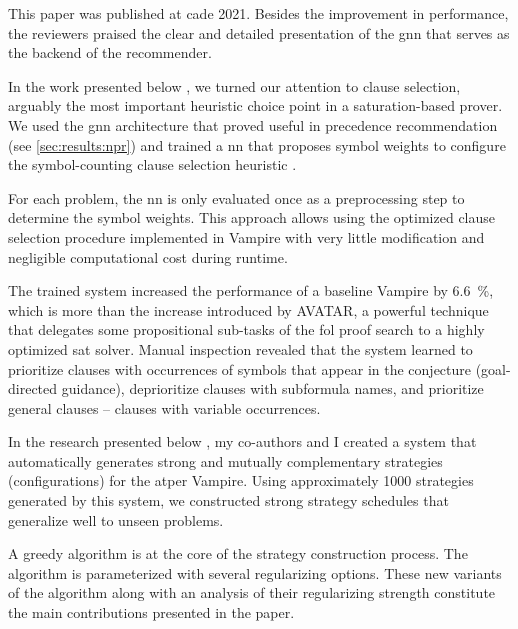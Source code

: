 This paper was published at \gls{cade} 2021.
Besides the improvement in performance,
the reviewers praised the clear and detailed presentation of the \gls{gnn} that serves as the backend of the recommender.


\label{sec:results:selection}

In the work presented below \cite{DBLP:conf/lpar/Bartek023},
we turned our attention to clause selection,
arguably the most important heuristic choice point in a saturation-based prover.
We used the \gls{gnn} architecture
that proved useful in precedence recommendation (see \cref{sec:results:npr})
and trained a \gls{nn} that proposes symbol weights to configure the symbol-counting clause selection heuristic \cite{DBLP:conf/cade/SchulzM16,E-manual}.

For each problem, the \gls{nn} is only evaluated once as a preprocessing step to determine the symbol weights.
This approach allows using the optimized clause selection procedure implemented in Vampire
with very little modification and negligible computational cost during runtime.

The trained system increased the performance of a baseline Vampire by \SI{6.6}{\percent},
which is more than the increase introduced by AVATAR,
a powerful technique that delegates some propositional sub-tasks of the \gls{fol} proof search to a highly optimized \gls{sat} solver.
Manual inspection revealed that
the system learned to
prioritize clauses with occurrences of symbols that appear in the conjecture (goal-directed guidance),
deprioritize clauses with subformula names,
and prioritize general clauses -- clauses with variable occurrences.


\label{sec:results:regularization}

In the research presented below \cite{DBLP:conf/ijcar/BartekCS24},
my co-authors and I created a system that automatically generates strong and mutually complementary strategies (configurations) for the \gls{atper} Vampire.
Using approximately 1000 strategies generated by this system,
we constructed strong strategy schedules that generalize well to unseen problems.

A greedy algorithm is at the core of the strategy construction process.
The algorithm is parameterized with several regularizing options.
These new variants of the algorithm along with an analysis of their regularizing strength
constitute the main contributions presented in the paper.

